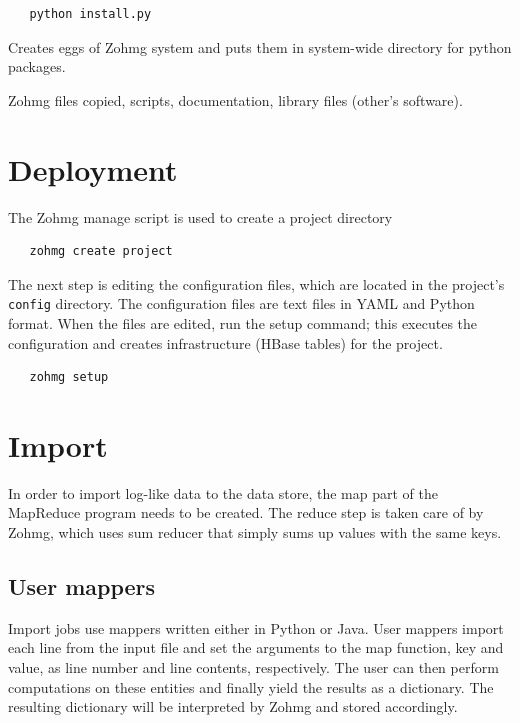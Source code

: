 \begin{verbatim}
   python install.py
\end{verbatim}

Creates eggs of Zohmg system and puts them in system-wide directory for python
packages.

Zohmg files copied, scripts, documentation, library files (other's software).


\section*{Deployment}

The Zohmg manage script is used to create a project directory

\begin{verbatim}
   zohmg create project
\end{verbatim}

\noindent The next step is editing the configuration files, which are located in
the project's \texttt{config} directory. The configuration files are text files
in YAML and Python format. When the files are edited, run the setup command;
this executes the configuration and creates infrastructure (HBase tables) for
the project.

\begin{verbatim}
   zohmg setup
\end{verbatim}


\section*{Import}

In order to import log-like data to the data store, the map part of the
MapReduce program needs to be created. The reduce step is taken care of by
Zohmg, which uses sum reducer that simply sums up values with the same keys.


\subsection*{User mappers}

Import jobs use mappers written either in Python or Java. User mappers import
each line from the input file and set the arguments to the map function, key and
value, as line number and line contents, respectively. The user can then perform
computations on these entities and finally yield the results as a dictionary.
The resulting dictionary will be interpreted by Zohmg and stored accordingly.

